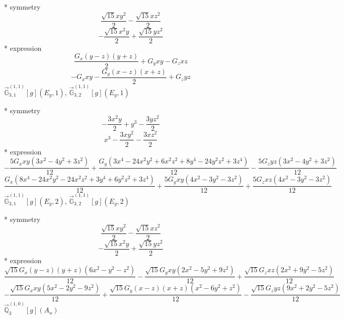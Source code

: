 \documentclass[fleqn,8pt]{jsarticle}
\begin{document}
\noindent\quad ** symmetry
\begin{dmath*}
\frac{\sqrt{15} x y^{2}}{2} - \frac{\sqrt{15} x z^{2}}{2}
\end{dmath*}
\begin{dmath*}
- \frac{\sqrt{15} x^{2} y}{2} + \frac{\sqrt{15} y z^{2}}{2}
\end{dmath*}
\noindent\quad ** expression
\begin{dmath*}
\frac{G_{x} \left(y - z\right) \left(y + z\right)}{2} + G_{y} x y - G_{z} x z
\end{dmath*}
\begin{dmath*}
- G_{x} x y - \frac{G_{y} \left(x - z\right) \left(x + z\right)}{2} + G_{z} y z
\end{dmath*}
\noindent\quad $\vec{\mathbb{G}}_{3,1}^{(1,1)}[g](E_{g},1)$, $\vec{\mathbb{G}}_{3,2}^{(1,1)}[g](E_{g},1)$

\noindent\quad ** symmetry
\begin{dmath*}
- \frac{3 x^{2} y}{2} + y^{3} - \frac{3 y z^{2}}{2}
\end{dmath*}
\begin{dmath*}
x^{3} - \frac{3 x y^{2}}{2} - \frac{3 x z^{2}}{2}
\end{dmath*}
\noindent\quad ** expression
\begin{dmath*}
- \frac{5 G_{x} x y \left(3 x^{2} - 4 y^{2} + 3 z^{2}\right)}{12} + \frac{G_{y} \left(3 x^{4} - 24 x^{2} y^{2} + 6 x^{2} z^{2} + 8 y^{4} - 24 y^{2} z^{2} + 3 z^{4}\right)}{12} - \frac{5 G_{z} y z \left(3 x^{2} - 4 y^{2} + 3 z^{2}\right)}{12}
\end{dmath*}
\begin{dmath*}
\frac{G_{x} \left(8 x^{4} - 24 x^{2} y^{2} - 24 x^{2} z^{2} + 3 y^{4} + 6 y^{2} z^{2} + 3 z^{4}\right)}{12} + \frac{5 G_{y} x y \left(4 x^{2} - 3 y^{2} - 3 z^{2}\right)}{12} + \frac{5 G_{z} x z \left(4 x^{2} - 3 y^{2} - 3 z^{2}\right)}{12}
\end{dmath*}
\noindent\quad $\vec{\mathbb{G}}_{3,1}^{(1,1)}[g](E_{g},2)$, $\vec{\mathbb{G}}_{3,2}^{(1,1)}[g](E_{g},2)$

\noindent\quad ** symmetry
\begin{dmath*}
\frac{\sqrt{15} x y^{2}}{2} - \frac{\sqrt{15} x z^{2}}{2}
\end{dmath*}
\begin{dmath*}
- \frac{\sqrt{15} x^{2} y}{2} + \frac{\sqrt{15} y z^{2}}{2}
\end{dmath*}
\noindent\quad ** expression
\begin{dmath*}
\frac{\sqrt{15} G_{x} \left(y - z\right) \left(y + z\right) \left(6 x^{2} - y^{2} - z^{2}\right)}{12} - \frac{\sqrt{15} G_{y} x y \left(2 x^{2} - 5 y^{2} + 9 z^{2}\right)}{12} + \frac{\sqrt{15} G_{z} x z \left(2 x^{2} + 9 y^{2} - 5 z^{2}\right)}{12}
\end{dmath*}
\begin{dmath*}
- \frac{\sqrt{15} G_{x} x y \left(5 x^{2} - 2 y^{2} - 9 z^{2}\right)}{12} + \frac{\sqrt{15} G_{y} \left(x - z\right) \left(x + z\right) \left(x^{2} - 6 y^{2} + z^{2}\right)}{12} - \frac{\sqrt{15} G_{z} y z \left(9 x^{2} + 2 y^{2} - 5 z^{2}\right)}{12}
\end{dmath*}
\noindent\quad $\vec{\mathbb{Q}}_{3}^{(1,0)}[g](A_{u})$
\end{document}
